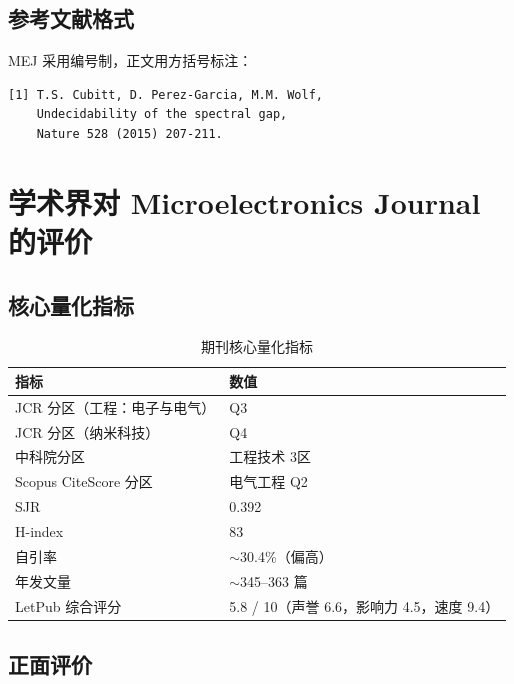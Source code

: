 \documentclass[11pt,a4paper]{article}
\begin{document}
\subsection{参考文献格式}
\small
MEJ 采用编号制，正文用方括号标注：
\begin{verbatim}
[1] T.S. Cubitt, D. Perez-Garcia, M.M. Wolf,
    Undecidability of the spectral gap,
    Nature 528 (2015) 207-211.
\end{verbatim}

\section{学术界对 Microelectronics Journal 的评价}

\subsection{核心量化指标}

\begin{table}[!htbp]
\centering
\small
\begin{tabular}{ll}
\toprule
\textbf{指标} & \textbf{数值} \\
\midrule
JCR 分区（工程：电子与电气） & Q3 \\
JCR 分区（纳米科技） & Q4 \\
中科院分区 & 工程技术 3区 \\
Scopus CiteScore 分区 & 电气工程 Q2 \\
SJR & 0.392 \\
H-index & 83 \\
自引率 & $\sim$30.4\%（偏高） \\
年发文量 & $\sim$345--363 篇 \\
LetPub 综合评分 & 5.8 / 10（声誉 6.6，影响力 4.5，速度 9.4） \\
\bottomrule
\end{tabular}
\caption{期刊核心量化指标}
\end{table}

\subsection{正面评价}
\end{document}
